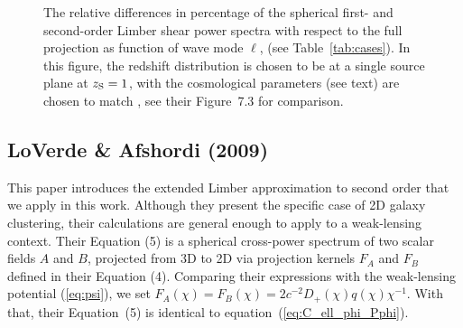 \documentclass[fleqn,usenatbib]{mnras} %
\begin{document}
\begin{appendix}
\begin{figure}
  \begin{center}
  \end{center}

    \caption{The relative differences in percentage of the spherical first- and second-order Limber
    shear power spectra with respect to the full projection
    as function of wave mode $\ell$, (see Table~\ref{tab:cases}). In this figure, the redshift distribution is chosen to be
    at a single source plane at $z_{\rm S}=1$, with the cosmological parameters (see text) are chosen to match
    \citet{vande2012}, see their Figure~7.3 for comparison.
    }

    \label{fig:L1L2E_Rijt}

\end{figure}



\subsection{LoVerde \& Afshordi (2009)}

This paper introduces the extended Limber approximation to second order that we
apply in this work. Although they present the specific case of 2D galaxy
clustering, their calculations are general enough to apply to a weak-lensing
context. Their Equation (5) is a spherical cross-power spectrum of two scalar
fields $A$ and $B$, projected from 3D to 2D via projection kernels $F_A$ and
$F_B$ defined in their Equation (4). Comparing their expressions with the
weak-lensing potential (\ref{eq:psi}), we set $F_A(\chi) = F_B(\chi) = 2 c^{-2}
D_+(\chi) q(\chi) \chi^{-1}$. With that, their Equation~(5) is identical to
equation~(\ref{eq:C_ell_phi_Pphi}).


\end{appendix}
\end{document}
